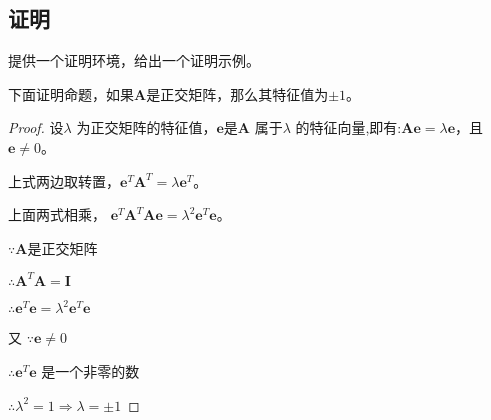

\lstset{language=Matlab}

\appendix
\begin{appendix}
\chapter{证明}
\begin{spacing}{1.5}
提供一个证明环境，给出一个证明示例。

下面证明命题，如果$\bm{A}$是正交矩阵，那么其特征值为$\pm1$。
\begin{proof}
设$\lambda$ 为正交矩阵的特征值，$\bm{e}$是$\bm{A}$ 属于$\lambda$ 的特征向量,即有:$\bm{A}\bm{e}=\lambda\bm{e}$，且$\bm{e}\neq0$。

上式两边取转置，$\bm{e}^{T}\bm{A}^{T}=\lambda\bm{e}^{T}$。

上面两式相乘， $\bm{e}^{T}\bm{A}^{T}\bm{A}\bm{e}=\lambda^2\bm{e}^{T}\bm{e}$。

$\because\bm{A}$是正交矩阵

$\therefore\bm{A}^{T}\bm{A}=\bm{I}$

$\therefore\bm{e}^{T}\bm{e}=\lambda^2\bm{e}^{T}\bm{e}$

又 $\because\bm{e}\neq0$

$\therefore\bm{e}^{T}\bm{e}$ 是一个非零的数

$\therefore\lambda^2=1\Rightarrow\lambda=\pm1$
\end{proof}



\end{spacing}

\end{appendix}

